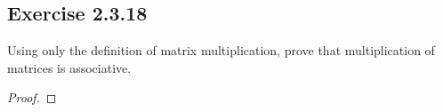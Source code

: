\subsection*{Exercise 2.3.18} Using only the definition of matrix multiplication, prove that multiplication of matrices is associative. 
\begin{proof}

\end{proof}
